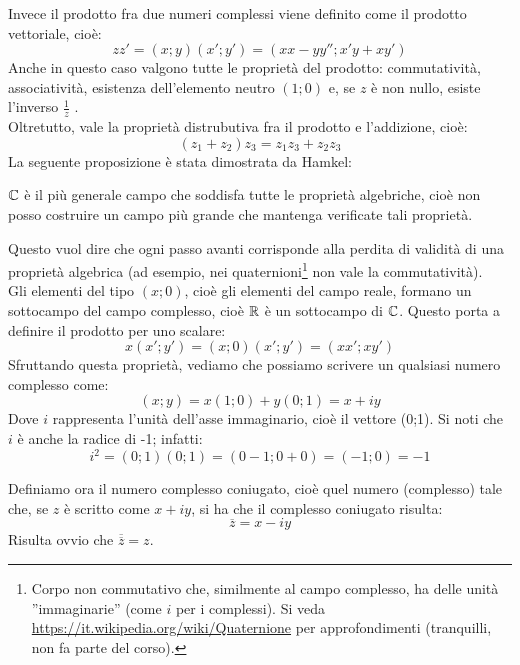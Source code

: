 Invece il prodotto fra due numeri complessi viene definito come il prodotto vettoriale, cioè:
$$zz'=(x;y)(x';y')=(xx-yy'';x'y+xy')$$
Anche in questo caso valgono tutte le proprietà del prodotto: commutatività, associatività, esistenza dell'elemento neutro $(1;0)$ e, se $z$ è non nullo, esiste l'inverso $\frac {1}{z}$ .
\\
Oltretutto, vale la proprietà distrubutiva fra il prodotto e l'addizione, cioè:
$$( z_1 + z_2 )z_3 = z_1 z_3 + z_2 z_3$$
La seguente proposizione è stata dimostrata da Hamkel:
\begin{teorema}
$\mathbb{C}$  è il più generale campo che soddisfa tutte le proprietà algebriche, cioè non posso costruire un campo più grande che mantenga verificate tali proprietà.
\end{teorema}
Questo vuol dire che ogni passo avanti corrisponde alla perdita di validità di una proprietà algebrica (ad esempio, nei quaternioni\footnote{Corpo non commutativo che, similmente al campo complesso, ha delle unità ''immaginarie'' (come $i$ per i complessi). Si veda \url{https://it.wikipedia.org/wiki/Quaternione} per approfondimenti (tranquilli, non fa parte del corso).} non vale la commutatività).
\\
Gli elementi del tipo $(x;0)$, cioè gli elementi del campo reale, formano un sottocampo del campo complesso, cioè $\mathbb{R}$ è un sottocampo di $\mathbb{C}$. Questo porta a definire il prodotto per uno scalare:
$$x(x';y')=(x;0) (x';y')=(xx';xy')$$
Sfruttando questa proprietà, vediamo che possiamo scrivere un qualsiasi numero complesso come:
$$(x;y)=x(1;0)+y(0;1)=x+iy$$
Dove $i$ rappresenta l'unità dell'asse immaginario, cioè il vettore (0;1). Si noti che $i$ è anche la radice di -1; infatti:
$$i^2=(0;1) (0;1)=(0-1;0+0)=(-1;0)=-1$$

Definiamo ora il numero complesso coniugato, cioè quel numero (complesso) tale che, se $z$ è scritto come $x+iy$, si ha che il complesso coniugato risulta:
$$\overline{z}=x-iy$$
Risulta ovvio che $\overline{\overline{z}}=z$.

